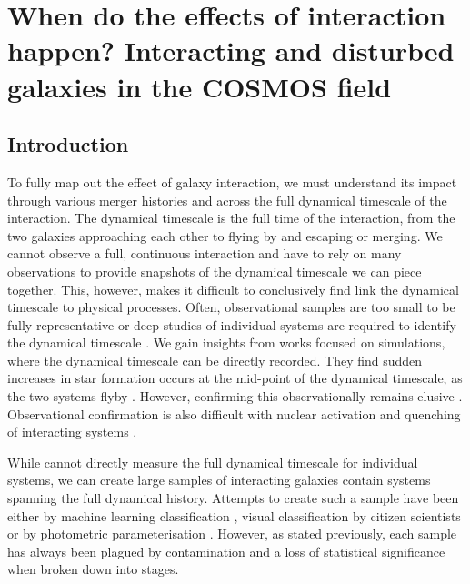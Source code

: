 \chapter{When do the effects of interaction happen? Interacting and disturbed galaxies in the COSMOS field}\label{chapter3}



\section{Introduction}\label{introduction}
\noindent To fully map out the effect of galaxy interaction, we must understand its impact through various merger histories and across the full dynamical timescale of the interaction. The dynamical timescale is the full time of the interaction, from the two galaxies approaching each other to flying by and escaping or merging. We cannot observe a full, continuous interaction and have to rely on many observations to provide snapshots of the dynamical timescale we can piece together. This, however, makes it difficult to conclusively find link the dynamical timescale to physical processes. Often, observational samples are too small to be fully representative or deep studies of individual systems are required to identify the dynamical timescale \citep{2000ApJ...530..660B, 2012A&A...539A..45L, 2014A&A...567A.132W}. We gain insights from works focused on simulations, where the dynamical timescale can be directly recorded. They find sudden increases in star formation occurs at the mid-point of the dynamical timescale, as the two systems flyby \citep{2008MNRAS.384..386C, 2019MNRAS.490.2139R, 2021MNRAS.503.3113M}. However, confirming this observationally remains elusive \citep{2023ApJ...958...96R}. Observational confirmation is also difficult with nuclear activation and quenching of interacting systems \citep{2011MNRAS.418.2043E, 2018PASJ...70S..37G, 2023ApJ...942..107S}. 

While cannot directly measure the full dynamical timescale for individual systems, we can create large samples of interacting galaxies contain systems spanning the full dynamical history. Attempts to create such a sample have been either by machine learning classification \citep{2019A&A...626A..49P, 2023A&A...669A.141S}, visual classification by citizen scientists \citep{2010MNRAS.401.1043D} or by photometric parameterisation \citep{2004AJ....128..163L, 2023MNRAS.522....1N}. However, as stated previously, each sample has always been plagued by contamination and a loss of statistical significance when broken down into stages.

